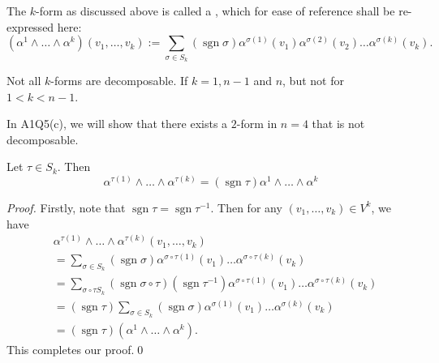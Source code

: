 \documentclass[notoc,notitlepage]{tufte-book}
\DeclareMathOperator{\sgn}{sgn}
\begin{document}
\begin{fullwidth}
\begin{defn}\label{defn:decomposable_k_form}
  The $k$-form as discussed above is called a , which for
  ease of reference shall be re-expressed here:
  \begin{equation*}
    \left( \alpha^1 \land \hdots \land \alpha^k \right) ( v_1, \ldots, v_k )
    := \sum_{\sigma \in S_k} \left( \sgn \sigma \right) \alpha^{\sigma(1)}(v_1) \alpha^{\sigma(2)}(v_2) \hdots \alpha^{\sigma(k)}(v_k).
  \end{equation*}
\end{defn}
\end{fullwidth}

\begin{note}
  Not all $k$-forms are decomposable. If $k = 1, n - 1$ and $n$, but not for $1 < k < n - 1$.
\end{note}

In A1Q5(c), we will show that there exists a $2$-form in $n = 4$ that is not decomposable.

\begin{propo}\label{propo:permutation_on_k_forms}
  Let $\tau \in S_k$. Then
  \begin{equation*}
    \alpha^{\tau(1)} \land \hdots \land \alpha^{\tau(k)}
      = ( \sgn \tau ) \alpha^1 \land \hdots \land \alpha^{k}
  \end{equation*}
\end{propo}

\begin{proof}
  Firstly, note that $\sgn \tau = \sgn \tau^{-1}$. Then for any $(v_1, \ldots, v_k) \in V^k$,
  we have
  \begin{align*}
    &\alpha^{\tau(1)} \land \hdots \land \alpha^{\tau(k)} (v_1, \ldots, v_k) \\
    &= \sum_{\sigma \in S_k} (\sgn \sigma) \alpha^{\sigma \circ \tau(1)} (v_1) \hdots \alpha^{\sigma \circ \tau (k)} (v_k) \\
    &= \sum_{\sigma \circ \tau S_k} (\sgn \sigma \circ \tau) \left(\sgn \tau^{-1}\right)
      \alpha^{\sigma \circ \tau(1)} (v_1) \hdots \alpha^{\sigma \circ \tau(k)} (v_k) \\
    &= (\sgn \tau) \sum_{\sigma \in S_k} (\sgn \sigma)
      \alpha^{\sigma(1)} (v_1) \hdots \alpha^{\sigma(k)} (v_k) \\
    &= (\sgn \tau) (\alpha^1 \land \hdots \land \alpha^k).
  \end{align*}
  This completes our proof.\qed\
\end{proof}
\end{document}
